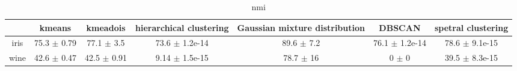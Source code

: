 \begin{table}
\centering
\begin{tabular}{ccccccc}
\toprule
 & kmeans & kmeadois & hierarchical clustering & Gaussian mixture distribution & DBSCAN & spetral clustering \\
\midrule
iris & 75.3 $\pm$ 0.79 & 77.1 $\pm$ 3.5 & 73.6 $\pm$ 1.2e-14 & 89.6 $\pm$ 7.2 & 76.1 $\pm$ 1.2e-14 & 78.6 $\pm$ 9.1e-15 \\
wine & 42.6 $\pm$ 0.47 & 42.5 $\pm$ 0.91 & 9.14 $\pm$ 1.5e-15 & 78.7 $\pm$ 16 & 0 $\pm$ 0 & 39.5 $\pm$ 8.3e-15 \\
\bottomrule
\end{tabular}
\caption{nmi}
\label{table:nmi}
\end{table}
